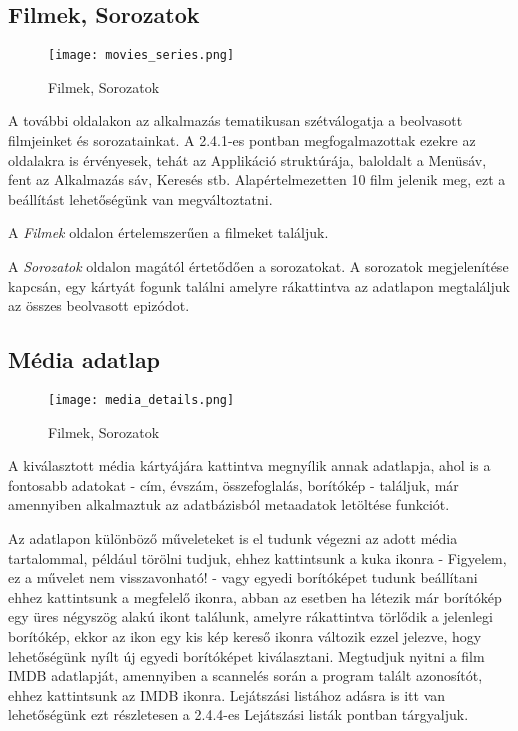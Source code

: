 \subsection{Filmek, Sorozatok}
\begin{figure}[H]
	\centering
	\texttt{[image: movies\_series.png]}
	\caption{Filmek, Sorozatok}
	\label{fig:movies_series}
\end{figure}
A további oldalakon az alkalmazás tematikusan szétválogatja a beolvasott filmjeinket és sorozatainkat. A 2.4.1-es pontban megfogalmazottak ezekre az oldalakra is érvényesek, tehát az Applikáció struktúrája, baloldalt a Menüsáv, fent az Alkalmazás sáv, Keresés stb. Alapértelmezetten 10 film jelenik meg, ezt a beállítást lehetőségünk van megváltoztatni.

A {\it Filmek} oldalon értelemszerűen a filmeket találjuk.

A {\it Sorozatok} oldalon magától értetődően a sorozatokat. A sorozatok megjelenítése kapcsán, egy kártyát fogunk találni amelyre rákattintva az adatlapon megtaláljuk az összes beolvasott epizódot.

\subsection{Média adatlap}
\begin{figure}[H]
	\centering
	\texttt{[image: media\_details.png]}
	\caption{Filmek, Sorozatok}
	\label{fig:media_details}
\end{figure}
A kiválasztott média kártyájára kattintva megnyílik annak adatlapja, ahol is a fontosabb adatokat - cím, évszám, összefoglalás, borítókép - találjuk, már amennyiben alkalmaztuk az adatbázisból metaadatok letöltése funkciót.

Az adatlapon különböző műveleteket is el tudunk végezni az adott média tartalommal, például törölni tudjuk, ehhez kattintsunk a kuka ikonra - Figyelem, ez a művelet nem visszavonható! - vagy egyedi borítóképet tudunk beállítani ehhez kattintsunk a megfelelő ikonra, abban az esetben ha létezik már borítókép egy üres négyszög alakú ikont találunk, amelyre rákattintva törlődik a jelenlegi borítókép, ekkor az ikon egy kis kép kereső ikonra változik ezzel jelezve, hogy lehetőségünk nyílt új egyedi borítóképet kiválasztani. Megtudjuk nyitni a film IMDB adatlapját, amennyiben a scannelés során a program talált azonosítót, ehhez kattintsunk az IMDB ikonra. Lejátszási listához adásra is itt van lehetőségünk ezt részletesen a 2.4.4-es Lejátszási listák pontban tárgyaljuk.

